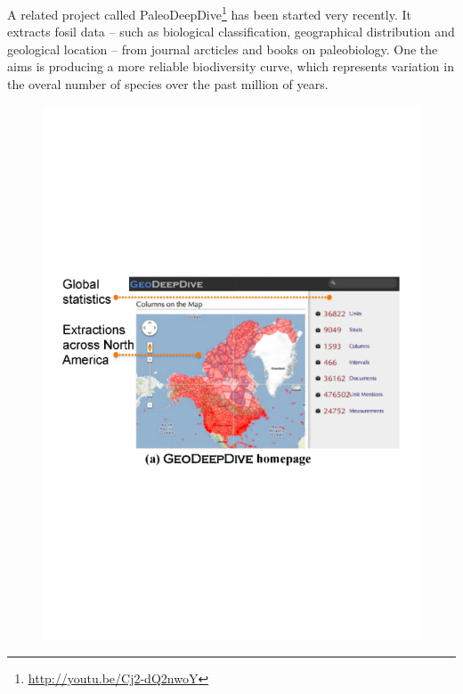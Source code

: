 A related project called PaleoDeepDive\footnote{\url{http://youtu.be/Cj2-dQ2nwoY}} has been started very recently.
It extracts fosil data -- such as biological classification, geographical distribution and geological location -- from journal arcticles and books on paleobiology.
One the aims is producing a more reliable biodiversity curve, which represents variation in the overal number of species over the past million of years.

\begin{figure}
\begin{center}
\includegraphics[scale=0.6]{figures/geodeepdive-1.pdf}

\end{center}
\end{figure}
